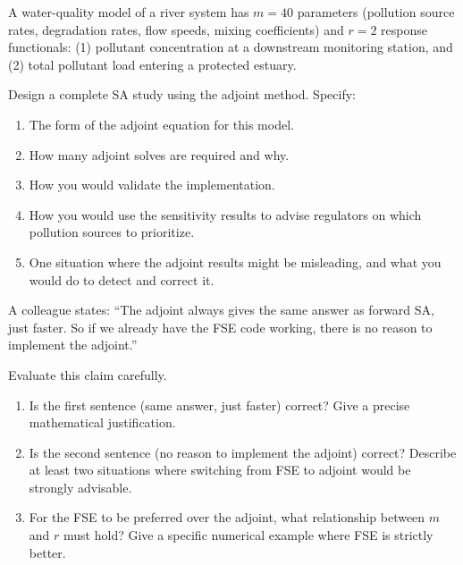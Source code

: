 \begin{exercise}[\bloom{L5}]
\label{ex:ch5:design}
A water-quality model of a river system has $m = 40$ parameters
(pollution source rates, degradation rates, flow speeds, mixing coefficients)
and $r = 2$ response functionals: (1) pollutant concentration at a
downstream monitoring station, and (2) total pollutant load entering
a protected estuary.

Design a complete SA study using the adjoint method.
Specify:
\begin{enumerate}[label=(\alph*)]
  \item The form of the adjoint equation for this model.
  \item How many adjoint solves are required and why.
  \item How you would validate the implementation.
  \item How you would use the sensitivity results to advise
        regulators on which pollution sources to prioritize.
  \item One situation where the adjoint results might be misleading,
        and what you would do to detect and correct it.
\end{enumerate}
\end{exercise}

\begin{exercise}[\bloom{L6}]
\label{ex:ch5:critique}
A colleague states: ``The adjoint always gives the same answer as
forward SA, just faster. So if we already have the FSE code working,
there is no reason to implement the adjoint.''

Evaluate this claim carefully.
\begin{enumerate}[label=(\alph*)]
  \item Is the first sentence (same answer, just faster) correct?
        Give a precise mathematical justification.
  \item Is the second sentence (no reason to implement the adjoint)
        correct? Describe at least two situations where switching from
        FSE to adjoint would be strongly advisable.
  \item For the FSE to be preferred over the adjoint, what relationship
        between $m$ and $r$ must hold? Give a specific numerical example
        where FSE is strictly better.
\end{enumerate}
\end{exercise}


